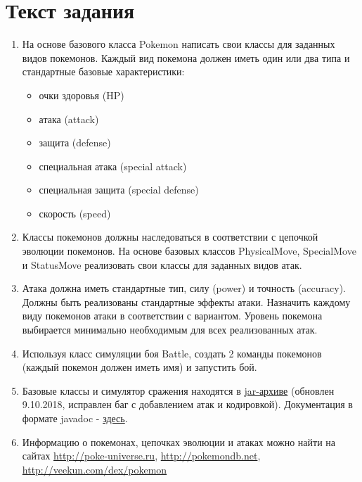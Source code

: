 



\itmo[
  variant=1500235,
  labn=2,
  discipline=Программирование,
  group=P3115,
  student=Владимир Мацюк,
  teacher=Сорокин Роман Борисович
]

\tableofcontents

\section{Текст задания}

\begin{enumerate}
  \item На основе базового класса Pokemon написать свои классы для заданных видов покемонов. Каждый вид покемона должен иметь один или два типа и стандартные базовые характеристики:
        \begin{itemize}
          \item очки здоровья (HP)
          \item атака (attack)
          \item защита (defense)
          \item специальная атака (special attack)
          \item специальная защита (special defense)
          \item скорость (speed)
        \end{itemize}
  \item Классы покемонов должны наследоваться в соответствии с цепочкой эволюции покемонов. На основе базовых классов PhysicalMove, SpecialMove и StatusMove реализовать свои классы для заданных видов атак.
        
  \item Атака должна иметь стандартные тип, силу (power) и точность (accuracy). Должны быть реализованы стандартные эффекты атаки. Назначить каждому виду покемонов атаки в соответствии с вариантом. Уровень покемона выбирается минимально необходимым для всех реализованных атак.
        
  \item Используя класс симуляции боя Battle, создать 2 команды покемонов (каждый покемон должен иметь имя) и запустить бой.
        
  \item Базовые классы и симулятор сражения находятся в \href{https://se.ifmo.ru/documents/10180/660917/Pokemon.jar/a7ce60af-6ee6-47d0-a95e-e5ed9a697bd2}{jar-архиве} (обновлен 9.10.2018, исправлен баг с добавлением атак и кодировкой). Документация в формате javadoc - \href{https://se.ifmo.ru/~tony/doc/}{здесь}.
        
  \item Информацию о покемонах, цепочках эволюции и атаках можно найти на сайтах \url{http://poke-universe.ru}, \url{http://pokemondb.net}, \url{http://veekun.com/dex/pokemon}
\end{enumerate}

